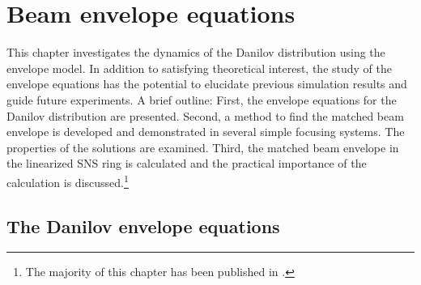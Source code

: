 \chapter{Beam envelope equations} \label{chap-2}

This chapter investigates the dynamics of the Danilov distribution using the envelope model. In addition to satisfying theoretical interest, the study of the envelope equations has the potential to elucidate previous simulation results and guide future experiments. A brief outline: First, the envelope equations for the Danilov distribution are presented. Second, a method to find the matched beam envelope is developed and demonstrated in several simple focusing systems. The properties of the solutions are examined. Third, the matched beam envelope in the linearized SNS ring is calculated and the practical importance of the calculation is discussed.\footnote{The majority of this chapter has been published in \cite{Hoover2021}.}


\section{The Danilov envelope equations}

